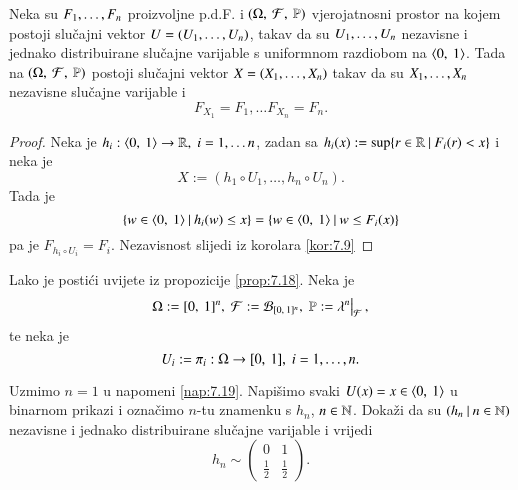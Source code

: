 \begin{prop}    \label{prop:7.18}
    Neka su ${F}_1, \ldots, {F}_n$ proizvoljne p.d.F. i $(\Omega, \: \mathcal{F}, \: \mathbb{P})$ vjerojatnosni prostor na kojem postoji slu\v cajni vektor $U = ({U}_1, \ldots, {U}_n)$, takav da su ${U}_1, \ldots, {U}_n $ nezavisne i jednako distribuirane slu\v cajne varijable s uniformnom razdiobom na $\langle {0}, \: {1} \rangle$.
    Tada na $(\Omega, \: \mathcal{F}, \: \mathbb{P})$ postoji slu\v cajni vektor $X = ({X}_1, \ldots, {X}_n)$ takav da su ${X}_1, \ldots, {X}_n$ nezavisne slu\v cajne varijable i
    \begin{equation*}
        F_{X_1} = F_1, \ldots F_{X_n} = F_n.
    \end{equation*}
\end{prop}

\begin{proof}
    Neka je $h_i : \langle {0}, \: {1} \rangle \to \mathbb{R}, \; i = 1, \ldots n$, zadan sa $h_i (x) := \sup \{{r \in \mathbb{R}} \: | \: {F_i (r) < x}\}$ i neka je
    \begin{equation*}
        X := (h_1 \circ U_1, \ldots, h_n \circ U_n).
    \end{equation*} 
    Tada je
    \begin{equation*}
        \{{w \in \langle {0}, \: {1} \rangle} \: | \: {h_i(w) \leq x}\} = \{{w \in \langle {0}, \: {1} \rangle} \: | \: {w \leq F_i (x)}\}
    \end{equation*}
    pa je $F_{h_i \circ U_i} = F_i$.
    Nezavisnost slijedi iz korolara \ref{kor:7.9}
\end{proof}

\begin{nap} \label{nap:7.19}
    Lako je posti\' ci uvijete iz propozicije \ref{prop:7.18}.
    Neka je
    \begin{equation*}
        \Omega := \segment{0}{1}^n, \; \famF := \borel{\segment{0}{1}^n}, \; \masP := \restr{\lambda^n}{\famF},
    \end{equation*}
    te neka je
    \begin{equation*}
        U_i := \pi_i : \Omega \to [{0}, \:{1}], \; i = 1, \ldots, n.
    \end{equation*}
\end{nap}

\begin{zad} \label{zad:7.20}
    Uzmimo $n = 1$ u napomeni \ref{nap:7.19}. Napi\v simo svaki $U(x) = x \in \langle {0}, \: {1} \rangle$ u binarnom prikazi i ozna\v cimo $n$-tu znamenku s $h_n$, $n \in \mathbb{N}$.
    Doka\v zi da su $({h_n} \: | \: {n \in \mathbb{N}})$ nezavisne i jednako distribuirane slu\v cajne varijable i vrijedi
    \begin{equation*}
        h_n \sim
        \begin{pmatrix}
            0& 1\\
            \frac{1}{2}& \frac{1}{2}    
        \end{pmatrix}.
    \end{equation*}
\end{zad}